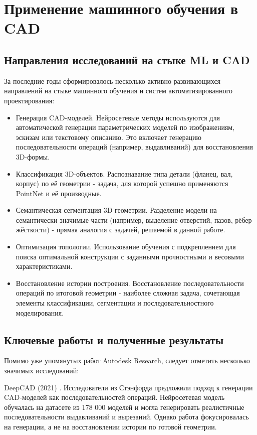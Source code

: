 
\section{Применение машинного обучения в CAD}

\subsection{Направления исследований на стыке ML и CAD}

За последние годы сформировалось несколько активно развивающихся направлений на стыке машинного обучения и систем автоматизированного проектирования:

\begin{itemize}
    \item Генерация CAD-моделей. Нейросетевые методы используются для автоматической генерации параметрических моделей по изображениям, эскизам или текстовому описанию. Это включает генерацию последовательности операций (например, выдавливаний) для восстановления 3D-формы.
    \item Классификация 3D-объектов. Распознавание типа детали (фланец, вал, корпус) по её геометрии - задача, для которой успешно применяются PointNet и её производные.
    \item Семантическая сегментация 3D-геометрии. Разделение модели на семантически значимые части (например, выделение отверстий, пазов, рёбер жёсткости) - прямая аналогия с задачей, решаемой в данной работе.
    \item Оптимизация топологии. Использование обучения с подкреплением для поиска оптимальной конструкции с заданными прочностными и весовыми характеристиками.
    \item Восстановление истории построения. Восстановление последовательности операций по итоговой геометрии - наиболее сложная задача, сочетающая элементы классификации, сегментации и последовательностного моделирования.
\end{itemize}

\subsection{Ключевые работы и полученные результаты}

Помимо уже упомянутых работ Autodesk Research, следует отметить несколько значимых исследований:

DeepCAD (2021) \cite{stanfordrlcad2021}. Исследователи из Стэнфорда предложили подход к генерации CAD-моделей как последовательностей операций. Нейросетевая модель обучалась на датасете из 178 000 моделей и могла генерировать реалистичные последовательности выдавливаний и вырезаний. Однако работа фокусировалась на генерации, а не на восстановлении истории по готовой геометрии.

